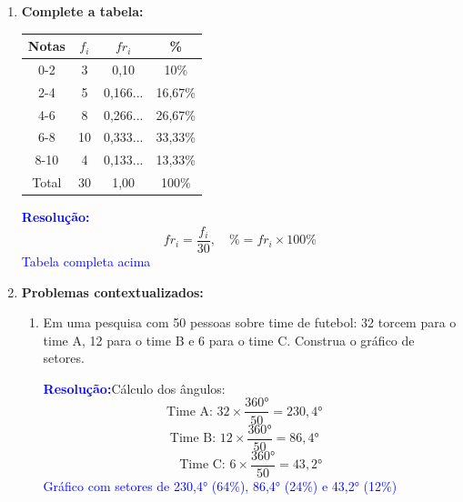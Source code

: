 \documentclass[11pt]{article}
\newcommand{\respostaNum}[1]{\textcolor{blue}{\boxed{#1}}}   %
\newcommand{\respostaTxt}[1]{\textcolor{blue}{#1}}           %
\newcommand{\resolucao}{\textbf{\textcolor{blue}{Resolução:}}}
\begin{document}
\begin{multicols}{2}
\begin{enumerate}[leftmargin=*]
\begin{enumerate}[label=\alph*)]
\resolucao
\[
    \bar{x} = \frac{5 + 6 + 7 + 8 + 5 + 6 + 9 + 7 + 6 + 8}{10} \]
\[= \frac{67}{10} = \respostaNum{6,7}
\]

\item Encontre a mediana

\resolucao Ordenando os dados: 5, 5, 6, 6, 6, 7, 7, 8, 8, 9
\[
Md = \frac{6 + 7}{2} = \frac{13}{2} = \respostaNum{6,5}
\]

\item Determine a moda

\resolucao O valor que mais aparece é 6 (três ocorrências)

\respostaTxt{Mo = 6}
\end{enumerate}

\item \textbf{Complete a tabela:}

\begin{center}
\begin{tabular}{|c|c|c|c|}
\hline
\textbf{Notas} & \textbf{$f_i$} & \textbf{$fr_i$} & \textbf{\%} \\
\hline
0-2 & 3 & 0,10 & 10\% \\
2-4 & 5 & 0,166... & 16,67\% \\
4-6 & 8 & 0,266... & 26,67\% \\
6-8 & 10 & 0,333... & 33,33\% \\
8-10 & 4 & 0,133... & 13,33\% \\
\hline
Total & 30 & 1,00 & 100\% \\
\hline
\end{tabular}
\end{center}

\resolucao
\[
fr_i = \frac{f_i}{30}, \quad \% = fr_i \times 100\%
\]
\respostaTxt{Tabela completa acima}

\item \textbf{Problemas contextualizados:}

\begin{enumerate}[label=\alph*)]
\item Em uma pesquisa com 50 pessoas sobre time de futebol: 32 torcem para o time A, 12 para o time B e 6 para o time C. Construa o gráfico de setores.

\resolucao Cálculo dos ângulos:
\[
 \text{Time A: } 32 \times \frac{360°}{50} = 230,4° \quad \] 
\[\text{Time B: } 12 \times \frac{360°}{50} = 86,4° \quad \]
\[\text{Time C: } 6 \times \frac{360°}{50} = 43,2°
\]
\respostaTxt{Gráfico com setores de 230,4° (64\%), 86,4° (24\%) e 43,2° (12\%)}


\end{enumerate}
\end{enumerate}
\end{multicols}
\end{document}
